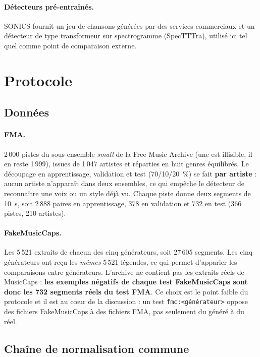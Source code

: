 \documentclass[a4paper, 11pt]{article}
\begin{document}
\paragraph{Détecteurs pré-entraînés.} SONICS \cite{rahman2025sonics} fournit un jeu de chansons générées par
des services commerciaux et un détecteur de type transformeur sur spectrogramme (SpecTTTra), utilisé ici
tel quel comme point de comparaison externe.

\section{Protocole}
\label{sec:protocole}

\subsection{Données}

\paragraph{FMA.} 2\,000 pistes du sous-ensemble \emph{small} de la Free Music Archive
\cite{defferrard2017fma} (une est illisible, il en reste 1\,999), issues de 1\,047 artistes et réparties en
huit genres équilibrés. Le découpage en apprentissage, validation et test (70/10/20~\%) se fait \textbf{par
artiste} : aucun artiste n'apparaît dans deux ensembles, ce qui empêche le détecteur de reconnaître une voix
ou un style déjà vu. Chaque piste donne deux segments de 10~s, soit 2\,888 paires en apprentissage, 378 en
validation et 732 en test (366 pistes, 210 artistes).

\paragraph{FakeMusicCaps.} Les 5\,521 extraits de chacun des cinq générateurs, soit 27\,605 segments.
Les cinq générateurs ont reçu les \emph{mêmes} 5\,521 légendes, ce qui permet d'apparier les comparaisons
entre générateurs. L'archive ne contient pas les extraits réels de MusicCaps : \textbf{les exemples
négatifs de chaque test FakeMusicCaps sont donc les 732 segments réels du test FMA}. Ce choix est le point
faible du protocole et il est au cœur de la discussion : un test \texttt{fmc:<générateur>} oppose des
fichiers FakeMusicCaps à des fichiers FMA, pas seulement du généré à du réel.

\subsection{Chaîne de normalisation commune}
\end{document}
